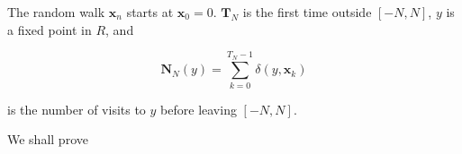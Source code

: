 The random walk $\mathbf{x}_n$ starts at $\mathbf{x}_0 = 0$. $\mathbf{T}_N$ is the first time outside $[-N,N]$, $y$ is a fixed point in $R$, and

$$\mathbf{N}_N(y) = \sum_{k=0}^{T_N-1} \delta(y,\mathbf{x}_k)$$

is the number of visits to $y$ before leaving $[-N,N]$.

We shall prove